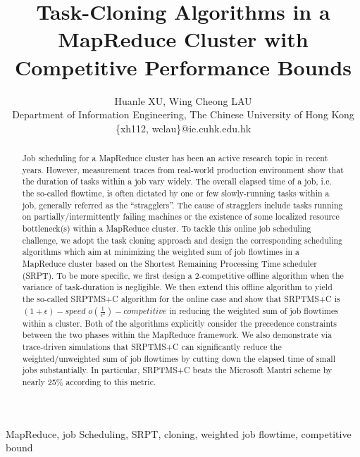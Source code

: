 \documentclass[10pt,conference,compsocconf,letterpaper]{IEEEtran}
\begin{document}
\title{Task-Cloning Algorithms in a MapReduce Cluster with Competitive Performance Bounds}

\author{Huanle XU, Wing Cheong LAU \\ Department of Information Engineering, The Chinese University of Hong Kong\\\{xh112, wclau\}@ie.cuhk.edu.hk \\
}

\maketitle



\begin{abstract}
Job scheduling for a MapReduce cluster has been an active research topic in recent years. However, measurement traces from  real-world production environment show that the duration of tasks within a job vary widely.
The overall elapsed time of a job, i.e. the so-called flowtime,  is often dictated by one or few slowly-running tasks within a job, generally referred as the  ``stragglers''.  The cause of stragglers include tasks running on partially/intermittently failing machines or the existence of some  localized resource bottleneck(s) within a MapReduce cluster.
To tackle this online job scheduling challenge, we adopt the task cloning approach and design the corresponding scheduling algorithms which aim at minimizing the weighted sum of job flowtimes in a MapReduce cluster based on the Shortest Remaining Processing Time scheduler (SRPT). To be more specific, we first design a 2-competitive offline algorithm
when the variance of task-duration is negligible. We then extend  this offline algorithm to yield the so-called  SRPTMS+C algorithm for the online case and show that SRPTMS+C is $(1+\epsilon)-speed$ $o(\frac{1}{\epsilon^2})-competitive$ in reducing the weighted sum of job flowtimes within a cluster. Both of the algorithms explicitly consider the precedence constraints between the two phases within the MapReduce framework.
We also demonstrate via trace-driven simulations  that SRPTMS+C can significantly reduce the weighted/unweighted sum of job flowtimes by cutting down the elapsed time of small jobs substantially.
In particular, SRPTMS+C beats the Microsoft Mantri scheme by nearly 25\% according to this metric.
\end{abstract}

\begin{keywords}
MapReduce, job Scheduling, SRPT, cloning, weighted job flowtime, competitive bound
\end{keywords}
\end{document}
